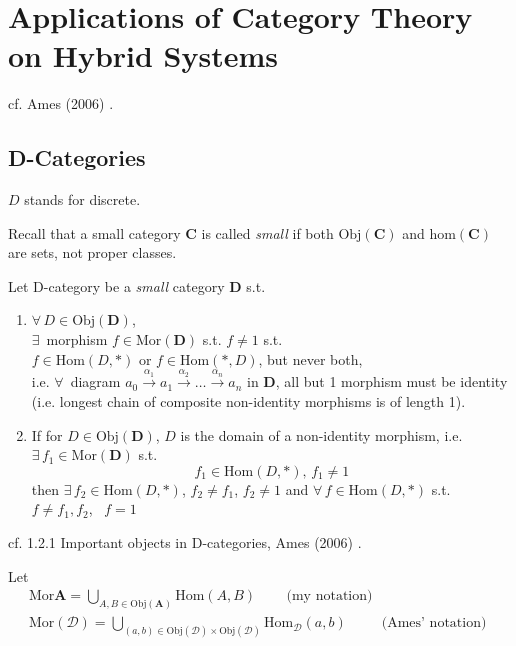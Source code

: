 \section{Applications of Category Theory on Hybrid Systems}

cf. Ames (2006) \cite{agat:Ames2006}.
	
\subsection{D-Categories}

$D$ stands for discrete.

Recall that a small category $\mathbf{C}$ is called \emph{small} if both $\text{Obj}(\mathbf{C})$ and $\text{hom}(\mathbf{C})$ are sets, not proper classes. 

\begin{definition}
Let D-category be a \emph{small} category $\mathbf{D}$ s.t.
\begin{enumerate}
	\item $\forall \, D \in \text{Obj}(\mathbf{D})$, \\
	$\exists \,$ morphism $f \in \text{Mor}(\mathbf{D})$ s.t. $f \neq 1$ s.t. \\
	$f \in \text{Hom}(D, *)$ or $f\in \text{Hom}(*, D)$, but never both, \\
	i.e. $\forall \, $ diagram $a_0 \xrightarrow{ \alpha_1} a_1 \xrightarrow{ \alpha_2} \dots \xrightarrow{ \alpha_n} a_n$ in $\mathbf{D}$, all but 1 morphism must be identity (i.e. longest chain of composite non-identity morphisms is of length 1). 
	\item If for $D\in \text{Obj}(\mathbf{D})$, $D$ is the domain of a non-identity morphism, i.e. $\exists \, f_1 \in \text{Mor}(\mathbf{D})$ s.t. 
	\[
	f_1 \in \text{Hom}(D, *), \, f_1 \neq 1
	\]
	then $\exists \, f_2 \in \text{Hom}(D, *)$, $f_2 \neq f_1$, $f_2 \neq 1$ and $\forall \, f \in \text{Hom}(D, *)$ s.t. $f\neq f_1,f_2$, \, $f=1$
\end{enumerate}
\end{definition}
	
cf. 1.2.1 Important objects in D-categories, Ames (2006) \cite{agat:Ames2006}.

Let 
\[
\begin{gathered}
	\text{Mor}{\mathbf{A}} = \bigcup_{A, B \in \text{Obj}(\mathbf{A})} \text{Hom}(A,B) \qquad \, \text{(my notation)} \\
	\text{Mor}(\mathcal{D}) = \bigcup_{(a,b) \in \text{Obj}(\mathcal{D}) \times \text{Obj}(\mathcal{D}) } \text{Hom}_{\mathcal{D}}(a,b) \qquad \, \text{ (Ames' notation) }
\end{gathered}
\]	
	
